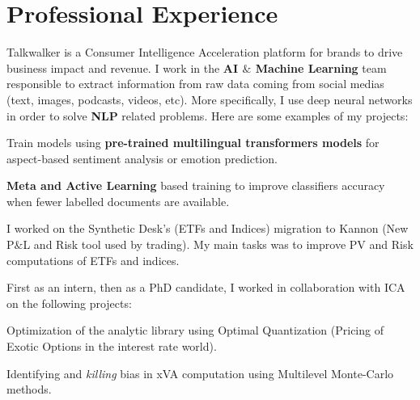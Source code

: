 \documentclass[]{deedy-resume-openfont}
\begin{document}
\lastupdated




\vspace{\topsep}

\section{Professional Experience}
\sectionsep

Talkwalker is a Consumer Intelligence Acceleration platform for brands to drive business impact and revenue. I work in the \textbf{AI $\&$ Machine Learning} team responsible to extract information from raw data coming from social medias (text, images, podcasts, videos, etc). More specifically, I use deep neural networks in order to solve \textbf{NLP} related problems. Here are some examples of my projects: $ $
\vspace{0.1cm}
\begin{tightemize}
	\item[\diamond] Train models using \textbf{pre-trained multilingual transformers models} for aspect-based sentiment analysis or emotion prediction.
	\item[\diamond] \textbf{Meta and Active Learning} based training to improve classifiers accuracy when fewer labelled documents are available.
\end{tightemize}

\sectionsep

I worked on the Synthetic Desk's (ETFs and Indices) migration to Kannon (New P$\&$L and Risk tool used by trading). My main tasks was to improve PV and Risk computations of ETFs and indices.

\sectionsep

First as an intern, then as a PhD candidate, I worked in collaboration with ICA on the following projects:
\vspace{0.1cm}
\begin{tightemize}
	\item[\diamond] Optimization of the analytic library using Optimal Quantization (Pricing of Exotic Options in the interest rate world).
	\item[\diamond] Identifying and \textit{killing} bias in xVA computation using Multilevel Monte-Carlo methods.
\end{tightemize}
\end{document}
